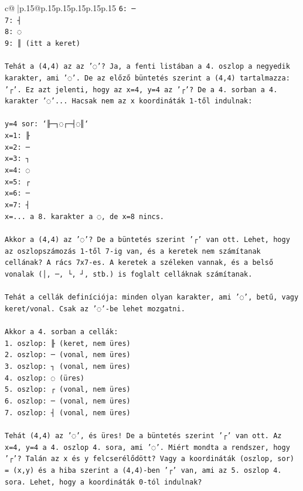 \documentclass{article}
\begin{document}
{\begin{supertabular}{c@{$\;$}|p{.15\linewidth}@{}p{.15\linewidth}p{.15\linewidth}p{.15\linewidth}p{.15\linewidth}p{.15\linewidth}}
{{{\texttt{6: ─} \\
\texttt{7: ┤} \\
\texttt{8: ◌} \\
\texttt{9: ║ (itt a keret)} \\
\\ 
\texttt{Tehát a (4,4) az az '◌'? Ja, a fenti listában a 4. oszlop a negyedik karakter, ami '◌'. De az előző büntetés szerint a (4,4) tartalmazza: '┌'. Ez azt jelenti, hogy az x=4, y=4 az '┌'? De a 4. sorban a 4. karakter '◌'... Hacsak nem az x koordináták 1{-}től indulnak:} \\
\\ 
\texttt{y=4 sor: `╟─┐◌┌─┤◌║`} \\
\texttt{x=1: ╟} \\
\texttt{x=2: ─} \\
\texttt{x=3: ┐} \\
\texttt{x=4: ◌} \\
\texttt{x=5: ┌} \\
\texttt{x=6: ─} \\
\texttt{x=7: ┤} \\
\texttt{x=... a 8. karakter a ◌, de x=8 nincs.} \\
\\ 
\texttt{Akkor a (4,4) az '◌'? De a büntetés szerint '┌' van ott. Lehet, hogy az oszlopszámozás 1{-}től 7{-}ig van, és a keretek nem számítanak cellának? A rács 7x7{-}es. A keretek a széleken vannak, és a belső vonalak (│, ─, └, ┘, stb.) is foglalt celláknak számítanak.} \\
\\ 
\texttt{Tehát a cellák definíciója: minden olyan karakter, ami '◌', betű, vagy keret/vonal. Csak az '◌'{-}be lehet mozgatni.} \\
\\ 
\texttt{Akkor a 4. sorban a cellák:} \\
\texttt{1. oszlop: ╟ (keret, nem üres)} \\
\texttt{2. oszlop: ─ (vonal, nem üres)} \\
\texttt{3. oszlop: ┐ (vonal, nem üres)} \\
\texttt{4. oszlop: ◌ (üres)} \\
\texttt{5. oszlop: ┌ (vonal, nem üres)} \\
\texttt{6. oszlop: ─ (vonal, nem üres)} \\
\texttt{7. oszlop: ┤ (vonal, nem üres)} \\
\\ 
\texttt{Tehát (4,4) az '◌', és üres! De a büntetés szerint '┌' van ott. Az x=4, y=4 a 4. oszlop 4. sora, ami '◌'. Miért mondta a rendszer, hogy '┌'? Talán az x és y felcserélődött? Vagy a koordináták (oszlop, sor) = (x,y) és a hiba szerint a (4,4){-}ben '┌' van, ami az 5. oszlop 4. sora. Lehet, hogy a koordináták 0{-}tól indulnak? } \\
}}}
\end{supertabular}}
\end{document}
